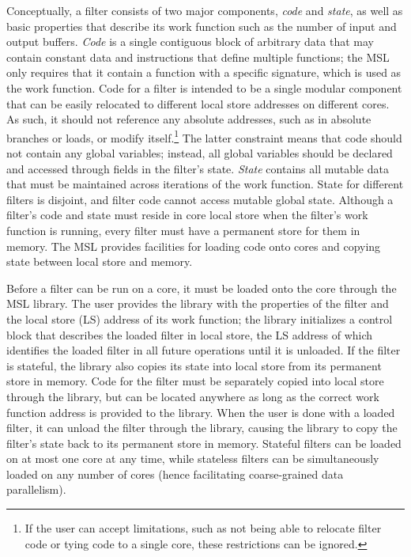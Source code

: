Conceptually, a filter consists of two major components, \emph{code}
and \emph{state}, as well as basic properties that describe its work
function such as the number of input and output buffers. \emph{Code} is
a single contiguous block of arbitrary data that may contain constant
data and instructions that define multiple functions; the MSL only
requires that it contain a function with a specific signature, which
is used as the work function. Code for a filter is intended to be a
single modular component that can be easily relocated to different
local store addresses on different cores. As such, it should not
reference any absolute addresses, such as in absolute branches or
loads, or modify itself.\footnote{If the user can accept limitations,
such as not being able to relocate filter code or tying code to a
single core, these restrictions can be ignored.} The latter constraint
means that code should not contain any global variables; instead, all
global variables should be declared and accessed through fields in the
filter's state. \emph{State} contains all mutable data that must be
maintained across iterations of the work function. State for different
filters is disjoint, and filter code cannot access mutable global
state. Although a filter's code and state must reside in core local
store when the filter's work function is running, every filter must
have a permanent store for them in memory. The MSL provides
facilities for loading code onto cores and copying state between local
store and memory.

Before a filter can be run on a core, it must be loaded onto the core
through the MSL library. The user provides the library with the
properties of the filter and the local store (LS) address of its work
function; the library initializes a control block that describes the
loaded filter in local store, the LS address of which identifies the
loaded filter in all future operations until it is unloaded. If the filter is stateful, the
library also copies its state into local store from its permanent
store in memory. Code for the filter must be separately copied into
local store through the library, but can be located anywhere as long
as the correct work function address is provided to the library. When
the user is done with a loaded filter, it can unload the filter
through the library, causing the library to copy the filter's state
back to its permanent store in memory. Stateful filters can be loaded
on at most one core at any time, while stateless filters can be
simultaneously loaded on any number of cores (hence facilitating
coarse-grained data parallelism).

